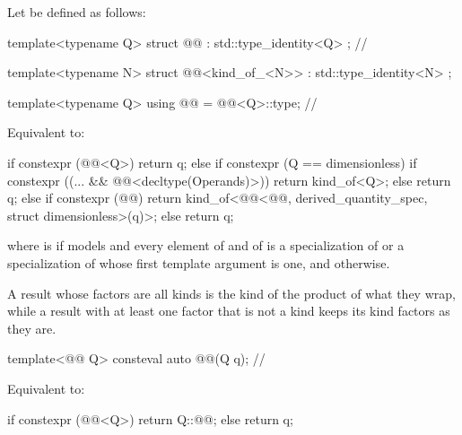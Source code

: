 \begin{itemdescr}
\pnum
Let  be defined as follows:
\begin{codeblock}
template<typename Q>
struct @@ : std::type_identity<Q> {};  // \expos

template<typename N>
struct @@<kind_of_<N>> : std::type_identity<N> {};

template<typename Q>
using @@ = @@<Q>::type;  // \expos
\end{codeblock}

\pnum
\effects
Equivalent to:
\begin{codeblock}
if constexpr (@@<Q>)
  return q;
else if constexpr (Q{} == dimensionless) {
  if constexpr ((... && @@<decltype(Operands)>))
    return kind_of<Q{}>;
  else
    return q;
} else if constexpr (@@)
  return kind_of<@@<@@, derived_quantity_spec, struct dimensionless>(q)>;
else
  return q;
\end{codeblock}
where  is  if
 models  and
every element of  and of 
is a specialization of  or
a specialization of  whose first template argument is one,
and  otherwise.
\begin{note}
A result whose factors are all kinds is the kind of the product of what they wrap,
while a result with at least one factor that is not a kind keeps its kind factors as they are.
\end{note}
\end{itemdescr}

\begin{itemdecl}
template<@@ Q>
consteval auto @@(Q q);                   // \expos
\end{itemdecl}

\begin{itemdescr}
\pnum
\effects
Equivalent to:
\begin{codeblock}
if constexpr (@@<Q>)
  return Q::@@;
else
  return q;
\end{codeblock}
\end{itemdescr}

